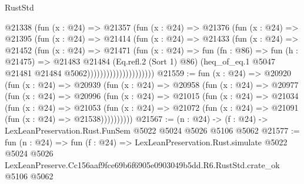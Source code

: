 \begin{lexlean}{RustStd}
\begin{coremodule}
                          @21338
                            (fun (x : @24) =>
                            @21357
                              (fun (x : @24) =>
                              @21376
                                (fun (x : @24) =>
                                @21395
                                  (fun (x : @24) =>
                                  @21414
                                    (fun (x : @24) =>
                                    @21433
                                      (fun (x : @24) =>
                                      @21452
                                        (fun (x : @24) =>
                                        @21471
                                          (fun (x : @24) =>
                                          fun (fn : @86) =>
                                          fun (h : @21475) =>
                                          @21483
                                            @21484
                                            (Eq.refl.{2} (Sort 1) @86)
                                            (heq_of_eq.{1}
                                              @5047
                                              @21481
                                              @21484
                                              @5062)))))))))))))))))))))
@21559 := fun (x : @24) =>
  @20920
    (fun (x : @24) =>
    @20939
      (fun (x : @24) =>
      @20958
        (fun (x : @24) =>
        @20977
          (fun (x : @24) =>
          @20996
            (fun (x : @24) =>
            @21015
              (fun (x : @24) =>
              @21034
                (fun (x : @24) =>
                @21053
                  (fun (x : @24) =>
                  @21072 (fun (x : @24) => @21091 (fun (x : @24) => @21538))))))))))
@21567 := (n : @24) -> (f : @24) -> LexLeanPreservation.Rust.FunSem @5022 @5024 @5026 @5106 @5062
@21577 := fun (n : @24) =>
  fun (f : @24) =>
  LexLeanPreservation.Rust.simulate
    @5022
    @5024
    @5026
    LexLeanPreserve.Cc156aaf9fce69b6f6905e0903049b5dd.R6.RustStd.crate_ok
    @5106
    @5062
\end{coremodule}
\end{lexlean}
